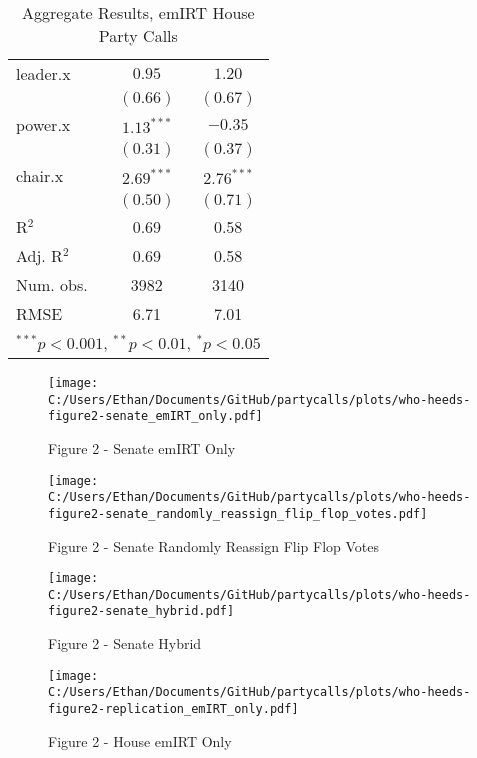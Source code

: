 \documentclass[12pt]{article}
\begin{document}
\begin{table}
\begin{center}
\begin{tabular}{l c c }
			leader.x                    & $0.95$        & $1.20$        \\
			& $(0.66)$      & $(0.67)$      \\
			power.x                     & $1.13^{***}$  & $-0.35$       \\
			& $(0.31)$      & $(0.37)$      \\
			chair.x                     & $2.69^{***}$  & $2.76^{***}$  \\
			& $(0.50)$      & $(0.71)$      \\
			\hline
			R$^2$                       & 0.69          & 0.58          \\
			Adj. R$^2$                  & 0.69          & 0.58          \\
			Num. obs.                   & 3982          & 3140          \\
			RMSE                        & 6.71          & 7.01          \\
			\hline
			\multicolumn{3}{l}{\scriptsize{$^{***}p<0.001$, $^{**}p<0.01$, $^*p<0.05$}}
		\end{tabular}
		\caption{Aggregate Results, emIRT House Party Calls}
	\end{center}
\end{table}
	
\begin{figure}[h]
	\caption{Figure 2 - Senate emIRT Only}
	\centering
	\texttt{[image: C:/Users/Ethan/Documents/GitHub/partycalls/plots/who-heeds-figure2-senate\_emIRT\_only.pdf]}
	
\end{figure}	

\begin{figure}[h]
	\caption{Figure 2 - Senate Randomly Reassign Flip Flop Votes}
	\centering
	\texttt{[image: C:/Users/Ethan/Documents/GitHub/partycalls/plots/who-heeds-figure2-senate\_randomly\_reassign\_flip\_flop\_votes.pdf]}
	
\end{figure}	
	
\begin{figure}[h]
	\caption{Figure 2 - Senate Hybrid}
	\centering
	\texttt{[image: C:/Users/Ethan/Documents/GitHub/partycalls/plots/who-heeds-figure2-senate\_hybrid.pdf]}
	
\end{figure}
	
\begin{figure}[h]
	\caption{Figure 2 - House emIRT Only}
	\centering
	\texttt{[image: C:/Users/Ethan/Documents/GitHub/partycalls/plots/who-heeds-figure2-replication\_emIRT\_only.pdf]}
	
\end{figure}
	
\end{document}
